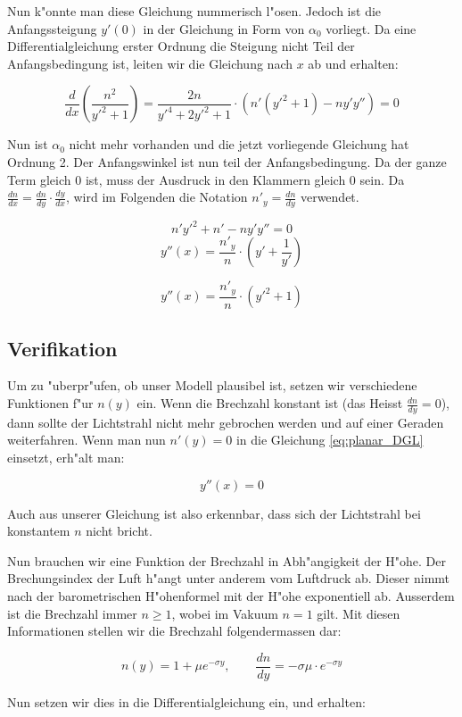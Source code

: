 \begin{refsection}
Nun k"onnte man diese Gleichung nummerisch l"osen. 
Jedoch ist die Anfangssteigung $y'(0)$ in der Gleichung in Form von $\alpha_0$ vorliegt. 
Da eine Differentialgleichung erster Ordnung die Steigung nicht Teil der Anfangsbedingung ist, leiten wir die Gleichung nach $x$ ab und erhalten:

$$\frac{d}{dx} \left( \frac{n^2}{y'^2 + 1} \right) = \frac{2n}{y'^4 + 2y'^2 + 1} \cdot \left( n'(y'^2 + 1) - n y' y'' \right) = 0$$

Nun ist $\alpha_0$ nicht mehr vorhanden und die jetzt vorliegende Gleichung hat Ordnung 2. 
Der Anfangswinkel ist nun teil der Anfangsbedingung. 
Da der ganze Term gleich 0 ist, muss der Ausdruck in den Klammern gleich 0 sein.
Da $\frac{dn}{dx} = \frac{dn}{dy} \cdot \frac{dy}{dx}$, wird im Folgenden die Notation $n'_y = \frac{dn}{dy}$ verwendet.

$$n' y'^2 + n' - n y' y'' = 0$$
$$y''(x) = \frac{n'_y}{n} \cdot \left( y' + \frac{1}{y'} \right)$$

\begin{equation} \label{eq:planar_DGL}
y''(x) = \frac{n'_y}{n} \cdot \left( y'^2 + 1\right)
\end{equation}


\subsection{Verifikation}
Um zu "uberpr"ufen, ob unser Modell plausibel ist, setzen wir verschiedene Funktionen f"ur $n(y)$ ein. 
Wenn die Brechzahl konstant ist (das Heisst $\frac{dn}{dy} = 0$), dann sollte der Lichtstrahl nicht mehr gebrochen werden und auf einer Geraden weiterfahren. 
Wenn man nun $n'(y)=0$ in die Gleichung \ref{eq:planar_DGL} einsetzt, erh"alt man: 

$$y''(x) = 0$$

Auch aus unserer Gleichung ist also erkennbar, dass sich der Lichtstrahl bei konstantem $n$ nicht bricht.

Nun brauchen wir eine Funktion der Brechzahl in Abh"angigkeit der H"ohe. 
Der Brechungsindex der Luft h"angt unter anderem vom Luftdruck ab. 
Dieser nimmt nach der barometrischen H"ohenformel mit der H"ohe exponentiell ab.
Ausserdem ist die Brechzahl immer $n \geq 1$, wobei im Vakuum $n=1$ gilt. 
Mit diesen Informationen stellen wir die Brechzahl folgendermassen dar:

$$n(y) = 1 + \mu e^{- \sigma y}, \qquad \frac{dn}{dy} = -\sigma \mu \cdot e^{-\sigma y}$$

Nun setzen wir dies in die Differentialgleichung ein, und erhalten:


\end{refsection}
